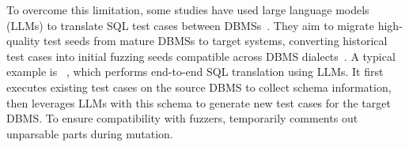 \documentclass[sigconf,review,anonymous]{acmart}
\begin{document}


To overcome this limitation, some studies have used large language models (LLMs) to translate SQL test cases between DBMSs~\cite{zhou2020database, xia2024fuzz4all, deng2023large, fu2024sedar}.
They aim to migrate high-quality test seeds from mature DBMSs to target systems, converting historical test cases into initial fuzzing seeds compatible across DBMS dialects~\cite{mundler2025type, lin2024sqless}.
A typical example is \sedar{}~\cite{fu2024sedar}, which performs end-to-end SQL translation using LLMs. It first executes existing test cases on the source DBMS to collect schema information, then leverages LLMs with this schema to generate new test cases for the target DBMS. To ensure compatibility with fuzzers, \sedar{} temporarily comments out unparsable parts during mutation.



\end{document}
